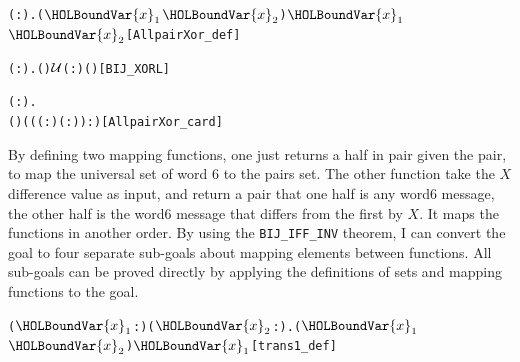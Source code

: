 \documentclass{article}
\begin{document}
\begin{alltt}
  \HOLTokenTurnstile{} \HOLSymConst{\HOLTokenForall{}}( :).   \HOLSymConst{=} \HOLTokenLeftbrace{}(\ensuremath{\HOLBoundVar{x}\sb{\mathrm{1}}}\HOLSymConst{,}\ensuremath{\HOLBoundVar{x}\sb{\mathrm{2}}}) \HOLTokenBar{} \ensuremath{\HOLBoundVar{x}\sb{\mathrm{1}}} \HOLSymConst{\HOLTokenEor{}} \ensuremath{\HOLBoundVar{x}\sb{\mathrm{2}}} \HOLSymConst{=} \HOLTokenRightbrace{}\hfill{[AllpairXor_def]}
\end{alltt}

\begin{alltt}
  \HOLTokenTurnstile{} \HOLSymConst{\HOLTokenForall{}}( :).  ( ) \ensuremath{{\cal{U}}}(:) ( )\hfill{[BIJ_XORL]}
\end{alltt}

\begin{alltt}
  \HOLTokenTurnstile{} \HOLSymConst{\HOLTokenForall{}}( :).
      ( ) \HOLSymConst{=} ((( :) \HOLSymConst{\HOLTokenExp{}} ( :)) :)\hfill{[AllpairXor_card]}
\end{alltt}

By defining two mapping functions, one just returns a half in pair given the pair, to map the universal set of word 6 to
the pairs set. The other function take the $X$ difference value as input, and return a pair that one half is any word6 message,
the other half is the word6 message that differs from the first by $X$. It maps the functions in another order. By using
the \verb|BIJ_IFF_INV| theorem, I can convert the goal to four separate sub-goals about mapping elements between functions.
All sub-goals can be proved directly by applying the definitions of sets and mapping functions to the goal.

\begin{alltt}
  \HOLTokenTurnstile{} \HOLSymConst{\HOLTokenForall{}}(\ensuremath{\HOLBoundVar{x}\sb{\mathrm{1}}} :) (\ensuremath{\HOLBoundVar{x}\sb{\mathrm{2}}} :).  (\ensuremath{\HOLBoundVar{x}\sb{\mathrm{1}}}\HOLSymConst{,}\ensuremath{\HOLBoundVar{x}\sb{\mathrm{2}}}) \HOLSymConst{=} \ensuremath{\HOLBoundVar{x}\sb{\mathrm{1}}}\hfill{[trans1_def]}
\end{alltt}
\end{document}
